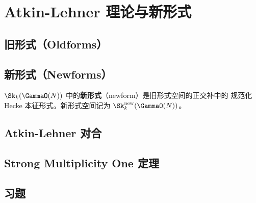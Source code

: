 \chapter{Atkin-Lehner 理论与新形式}
\label{ch:newforms}

\section{旧形式（Oldforms）}


\section{新形式（Newforms）}

\begin{definition}[新形式]
$\Sk_k(\GammaO(N))$ 中的\textbf{新形式}（newform）是旧形式空间的正交补中的
规范化 Hecke 本征形式。新形式空间记为 $\Sk_k^{\mathrm{new}}(\GammaO(N))$。
\end{definition}


\section{Atkin-Lehner 对合}


\section{Strong Multiplicity One 定理}


\section{习题}
